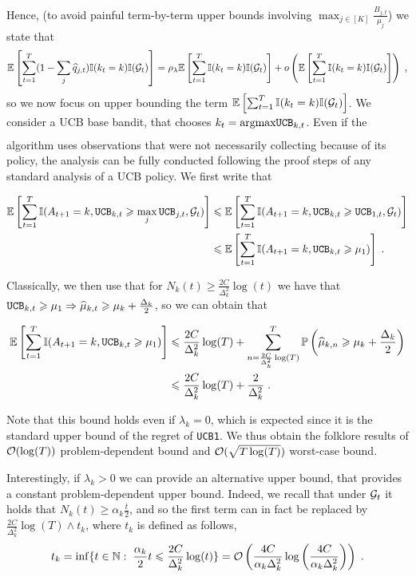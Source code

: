 Hence, (to avoid painful term-by-term upper bounds involving $\max_{j \in[K]} \frac{B_{j,t}}{\mu_j}$) we state that \[\mathbb{E}\left[\sum_{t=1}^T (1-\sum_j \widehat{q}_{j, t}) \mathbb{I}(k_t=k)\mathbb{I}(\mathcal{G}_t)\right] = \rho_\lambda \mathbb{E}\left[\sum_{t=1}^T \mathbb{I}(k_t=k)\mathbb{I}(\mathcal{G}_t)\right] + o\left(\mathbb{E}\left[\sum_{t=1}^T \mathbb{I}(k_t=k)\mathbb{I}(\mathcal{G}_t)\right]\right)\;, \]
so we now focus on upper bounding the term $\mathbb{E}\left[\sum_{t=1}^T \mathbb{I}(k_t=k)\mathbb{I}(\mathcal{G}_t)\right]$. We consider a UCB base bandit, that chooses $k_t = \underset{}{\text{argmax}} \texttt{UCB}_{k, t}$. Even if the algorithm uses observations that were not necessarily collecting because of its policy, the analysis can be fully conducted following the proof steps of any standard analysis of a UCB policy.  We first write that

\begin{align*}
\mathbb{E}\left[\sum_{t=1}^T \mathbb{I}(A_{t+1}=k, \texttt{UCB}_{k, t}\geqslant \max_j \texttt{UCB}_{j, t}, \mathcal{G}_t)\right] & \leqslant \mathbb{E}\left[\sum_{t=1}^T \mathbb{I}(A_{t+1}=k, \texttt{UCB}_{k, t}\geqslant \texttt{UCB}_{1, t}, \mathcal{G}_t)\right] \\
& \leqslant \mathbb{E}\left[\sum_{t=1}^T \mathbb{I}(A_{t+1}=k, \texttt{UCB}_{k, t}\geqslant \mu_1)\right] \;. \end{align*}

Classically, we then use that for $N_k(t)\geq \frac{2C}{\Delta_k^2} \log(t)$ we have that $\texttt{UCB}_{k, t}\geqslant \mu_1 \Rightarrow \widehat{\mu}_{k, t} \geqslant \mu_k + \frac{\Delta_k}{2}$, so we can obtain that 

\begin{align*}
\mathbb{E}\left[\sum_{t=1}^T \mathbb{I}(A_{t+1}=k, \texttt{UCB}_{k, t}\geqslant \mu_1)\right] &\leqslant \frac{2C}{\Delta_k^2} \log(T) + \sum_{n=\frac{2C}{\Delta_k^2} \log(T)}^T \mathbb{P}\left(\widehat{\mu}_{k, n}\geqslant \mu_k + \frac{\Delta_k}{2}\right) \\
& \leqslant \frac{2C}{\Delta_k^2} \log(T) + \frac{2}{\Delta_k^2} \;.
\end{align*}

Note that this bound holds even if $\lambda_k=0$, which is expected since it is the standard upper bound of the regret of \texttt{UCB1}. We thus obtain the folklore results of $\mathcal{O}(\log(T))$ problem-dependent bound and $\mathcal{O}(\sqrt{T\log(T)})$ worst-case bound.

Interestingly, if $\lambda_k>0$ we can provide an alternative upper bound, that provides a constant problem-dependent upper bound. Indeed, we recall that under $\mathcal{G}_t$ it holds that $N_k(t)\geq \alpha_k \frac{t}{2}$, and so the first term can in fact be replaced by $\frac{2C}{\Delta_k^2}\log(T)\wedge t_k$, where $t_k$ is defined as follows,
\[t_k = \inf\{t\in \mathbb{N}: \; \frac{\alpha_k}{2}t\leqslant \frac{2C}{\Delta_k^2} \log(t) \}= \mathcal{O}\left(\frac{4C}{\alpha_k \Delta_k^2}\log\left(\frac{4C}{\alpha_k\Delta_k^2}\right)\right)\;.\]

